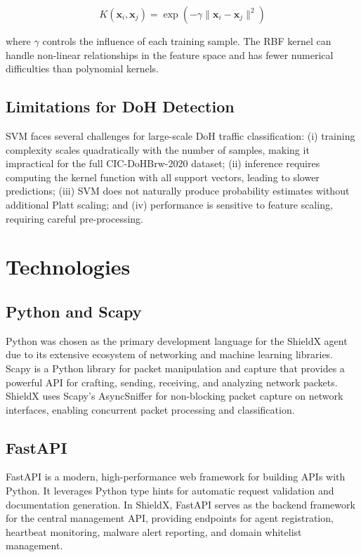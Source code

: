 \documentclass[../Main.tex]{subfiles}
\begin{document}
\begin{equation}
K(\mathbf{x}_i, \mathbf{x}_j) = \exp\left(-\gamma \|\mathbf{x}_i - \mathbf{x}_j\|^2\right)
\end{equation}

where $\gamma$ controls the influence of each training sample. The RBF kernel can handle non-linear relationships in the feature space and has fewer numerical difficulties than polynomial kernels.

\subsection{Limitations for DoH Detection}

SVM faces several challenges for large-scale DoH traffic classification: (i) training complexity scales quadratically with the number of samples, making it impractical for the full CIC-DoHBrw-2020 dataset; (ii) inference requires computing the kernel function with all support vectors, leading to slower predictions; (iii) SVM does not naturally produce probability estimates without additional Platt scaling; and (iv) performance is sensitive to feature scaling, requiring careful pre-processing.

\section{Technologies}
\label{section:3.7}

\subsection{Python and Scapy}

Python was chosen as the primary development language for the ShieldX agent due to its extensive ecosystem of networking and machine learning libraries. Scapy \cite{scapy} is a Python library for packet manipulation and capture that provides a powerful API for crafting, sending, receiving, and analyzing network packets. ShieldX uses Scapy's AsyncSniffer for non-blocking packet capture on network interfaces, enabling concurrent packet processing and classification.

\subsection{FastAPI}

FastAPI \cite{fastapi} is a modern, high-performance web framework for building APIs with Python. It leverages Python type hints for automatic request validation and documentation generation. In ShieldX, FastAPI serves as the backend framework for the central management API, providing endpoints for agent registration, heartbeat monitoring, malware alert reporting, and domain whitelist management.
\end{document}
